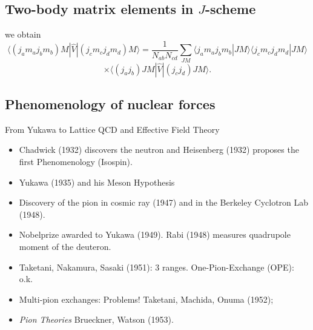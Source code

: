 \documentclass[%
twoside,                 %
final,                   %
10pt]{article}
\begin{document}
\subsection{Two-body matrix elements in $J$-scheme}
\begin{block}{}
we obtain
\[
\langle (j_am_aj_bm_b)M |  \hat{V} | (j_cm_cj_dm_d)M\rangle=\frac{1}{N_{ab}N_{cd}}\sum_{JM}\langle j_am_aj_bm_b|JM\rangle\langle j_cm_cj_dm_d|JM\rangle
\]
\[
\times \langle (j_aj_b) JM | \hat{V} | (j_cj_d) JM \rangle.
\]
\end{block}


\subsection{Phenomenology of nuclear forces}
\begin{block}{From Yukawa to Lattice QCD and Effective Field Theory }

\begin{itemize}
\item Chadwick (1932) discovers the neutron and Heisenberg (1932) proposes the first Phenomenology (Isospin).  

\item Yukawa (1935) and his Meson Hypothesis       

\item Discovery of the pion in cosmic ray (1947) and in the Berkeley Cyclotron Lab (1948).

\item Nobelprize awarded to Yukawa (1949).  Rabi (1948) measures quadrupole moment of the deuteron.

\item Taketani, Nakamura, Sasaki (1951): 3 ranges.      One-Pion-Exchange (OPE): o.k.

\item Multi-pion exchanges: Problems!   Taketani, Machida, Onuma (1952);

\item \emph{Pion Theories} Brueckner, Watson (1953).
\end{itemize}

\noindent
\end{block}

\end{document}
